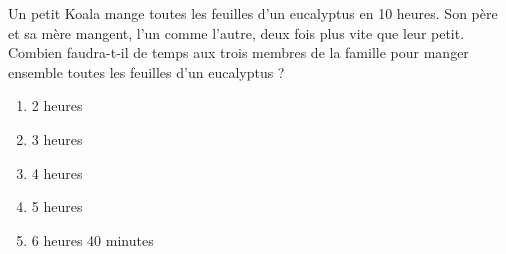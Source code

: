 Un petit Koala mange toutes les feuilles d'un eucalyptus en 10 heures. Son père et sa mère mangent, l'un comme l'autre, deux fois plus vite que leur petit. Combien faudra-t-il de temps aux trois membres de la famille pour manger ensemble toutes les feuilles d'un eucalyptus ?
\begin{multicols}{5}
  \begin{enumerate}[A/]
  \item 2 heures
  \item 3 heures
  \item 4 heures
  \item 5 heures
  \item 6 heures 40 minutes
  \end{enumerate}
\end{multicols}
